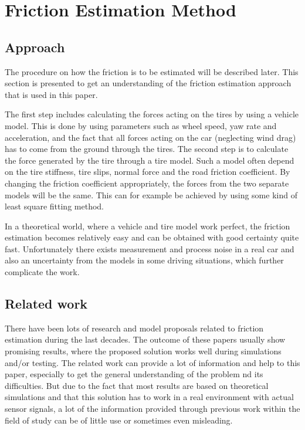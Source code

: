 \chapter{Friction Estimation Method}

\section{Approach}

The procedure on how the friction is to be estimated will be described later. This section is presented to get an understanding of the friction estimation approach that is used in this paper.

The first step includes calculating the forces acting on the tires by using a vehicle model. This is done by using parameters such as wheel speed, yaw rate and acceleration, and the fact that all forces acting on the car (neglecting wind drag) has to come from the ground through the tires. The second step is to calculate the force generated by the tire through a tire model. Such a model often depend on the tire stiffness, tire slips, normal force and the road friction coefficient. By changing the friction coefficient appropriately, the forces from the two separate models will be the same. This can for example be achieved by using some kind of least square fitting method. 

In a theoretical world, where a vehicle and tire model work perfect, the friction estimation becomes relatively easy and can be obtained with good certainty quite fast. Unfortunately there exists measurement and process noise in a real car and also an uncertainty from the models in some driving situations, which further complicate the work.


\section{Related work}

There have been lots of research and model proposals related to friction estimation during the last decades. The outcome of these papers usually show promising results, where the proposed solution works well during simulations and/or testing. The related work can provide a lot of information and help to this paper, especially to get the general understanding of the problem nd its difficulties. But due to the fact that most results are based on theoretical simulations and that this solution has to work in a real environment with actual sensor signals, a lot of the information provided through previous work within the field of study can be of little use or sometimes even misleading.


